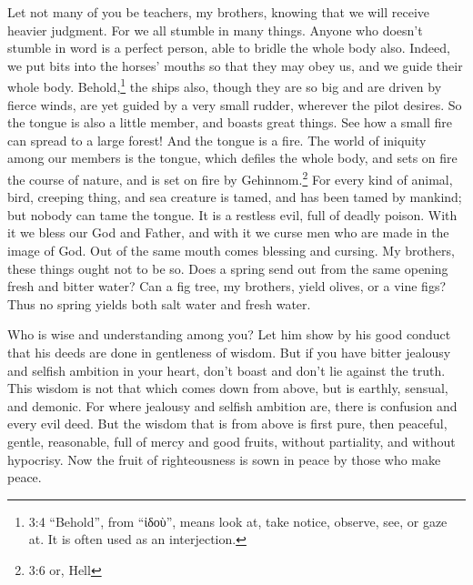 \mychapter{} \myverse*{}Let not many of you be teachers, my brothers, knowing that we will
receive heavier judgment.
\myverse{}For we all stumble in many things. Anyone who doesn’t stumble in word is a perfect
person, able to bridle the whole body also.
\myverse{}Indeed, we put bits into the horses’ mouths so that they may obey us, and we
guide their whole body.
\myverse{}Behold,\footnote{3:4 “Behold”, from “ἰδοὺ”, means look at, take notice, observe, see, or gaze at. It is often used
	as an interjection.} the ships also, though they are so big and are driven by fierce winds, are
yet guided by a very small rudder, wherever the pilot desires.
\myverse{}So the tongue is also a little member, and boasts great things. See how a small
fire can spread to a large forest!
\myverse{}And the tongue is a fire. The world of iniquity among our members is the tongue,
which defiles the whole body, and sets on fire the course of nature, and is set on fire by Gehinnom.\footnote{3:6 or, Hell}
\myverse{}For every kind of animal, bird, creeping thing, and sea creature is tamed, and
has been tamed by mankind;
\myverse{}but nobody can tame the tongue. It is a restless evil, full of deadly poison.
\myverse{}With it we bless our God and Father, and with it we curse men who are made in
the image of God.
\myverse{}Out of the same mouth comes blessing and cursing. My brothers, these things
ought not to be so.
\myverse{}Does a spring send out from the same opening fresh and bitter water?
\myverse{}Can a fig tree, my brothers, yield olives, or a vine figs? Thus no spring
yields both salt water and fresh water.

\myverse{}Who is wise and understanding among you? Let him show by his
good conduct that his deeds are done in gentleness of wisdom.
\myverse{}But if you have bitter jealousy and selfish ambition in your heart, don’t
boast and don’t lie against the truth.
\myverse{}This wisdom is not that which comes down from above, but is earthly, sensual,
and demonic.
\myverse{}For where jealousy and selfish ambition are, there is confusion and every
evil deed.
\myverse{}But the wisdom that is from above is first pure, then peaceful, gentle, reasonable,
full of mercy and good fruits, without partiality, and without hypocrisy.
\myverse{}Now the fruit of righteousness is sown in peace by those who make peace.


